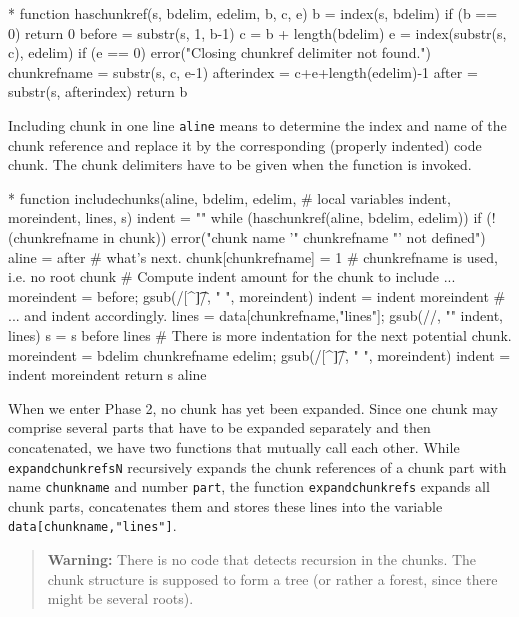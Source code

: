 \documentclass[a4paper]{article} %
\begin{document}
\begin{chunk}{*}
function haschunkref(s, bdelim, edelim,   b, c, e) {
  b = index(s, bdelim)
  if (b == 0) { return 0 }
  before = substr(s, 1, b-1)
  c = b + length(bdelim)
  e = index(substr(s, c), edelim)
  if (e == 0) {
    error("Closing chunkref delimiter not found.")
  }
  chunkrefname = substr(s, c, e-1)
  afterindex = c+e+length(edelim)-1
  after = substr(s, afterindex)
  return b
}
\end{chunk}

Including chunk in one line \texttt{aline} means to determine the
index and name of the chunk reference and replace it by the
corresponding (properly indented) code chunk. The chunk delimiters
have to be given when the function is invoked.
\begin{chunk}{*}
function includechunks(aline, bdelim, edelim,
  # local variables
  indent, moreindent, lines, s) {
  indent = ""
  while (haschunkref(aline, bdelim, edelim)) {
    if (!(chunkrefname in chunk)) {
      error("chunk name '" chunkrefname "' not defined")
    }
    aline = after # what's next.
    chunk[chunkrefname] = 1 # chunkrefname is used, i.e. no root chunk
    # Compute indent amount for the chunk to include ...
    moreindent = before; gsub(/[^\t]/, " ", moreindent)
    indent = indent moreindent
    # ... and indent accordingly.
    lines = data[chunkrefname,"lines"]; gsub(/\n/, "\n" indent, lines)
    s = s before lines
    # There is more indentation for the next potential chunk.
    moreindent = bdelim chunkrefname edelim; gsub(/[^\t]/, " ", moreindent)
    indent = indent moreindent
  }
  return s aline
}
\end{chunk}

When we enter Phase 2, no chunk has yet been expanded. Since one chunk
may comprise several parts that have to be expanded separately and
then concatenated, we have two functions that mutually call each
other. While \texttt{expandchunkrefsN} recursively expands the chunk
references of a chunk part with name \texttt{chunkname} and number
\texttt{part}, the function \texttt{expandchunkrefs} expands all chunk
parts, concatenates them and stores these lines into the variable
\texttt{data[chunkname,"lines"]}.

\begin{quote}
  \textbf{Warning:} There is no code that detects recursion in the
    chunks. The chunk structure is supposed to form a tree (or rather
    a forest, since there might be several roots).
\end{quote}
\end{document}
